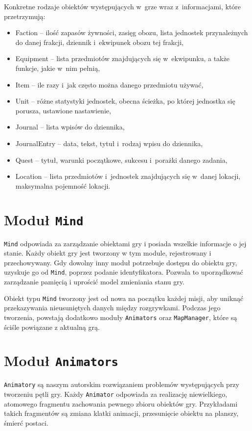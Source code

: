 \documentclass[licencjacka]{pracamgr}
\begin{document}
    Konkretne rodzaje obiektów występujących w~grze wraz z~informacjami, które przetrzymują:
    \begin{itemize}
      \item Faction -- ilość zapasów żywności, zasięg obozu, lista jednostek przynależnych do danej
	frakcji, dziennik i~ekwipunek obozu tej frakcji,
      \item Equipment -- lista przedmiotów znajdujących się w~ekwipunku, a także funkcje, jakie w~nim pełnią,
      \item Item --  ile razy i~jak często można danego przedmiotu używać,
      \item Unit -- różne statystyki jednostek, obecna ścieżka, po której jednostka się porusza, ustawione nastawienie,
      \item Journal -- lista wpisów do dziennika,
      \item JournalEntry -- data, tekst, tytuł i~rodzaj wpisu do dziennika,
      \item Quest -- tytuł, warunki początkowe, sukcesu i~porażki danego zadania,
      \item Location -- lista przedmiotów i~jednostek znajdujących się w~danej lokacji, maksymalna pojemność lokacji.
    \end{itemize}

  \section{Moduł \texttt{Mind}}

    \texttt{Mind} odpowiada za zarządzanie obiektami gry i posiada wszelkie informacje o jej stanie. 
    Każdy obiekt gry jest tworzony w tym module, rejestrowany i przechowywany. Gdy dowolny inny moduł potrzebuje dostępu do 
    obiektu gry, uzyskuje go od \texttt{Mind}, poprzez podanie identyfikatora. Pozwala to uporządkować zarządzanie pamięcią
    i uprościć model zmieniania stanu gry. 

    Obiekt typu \texttt{Mind} tworzony jest od nowa na początku każdej misji, aby uniknąć przekazywania nieusuniętych danych
    między rozgrywkami. Podczas jego tworzenia, powstają dodatkowo moduły \texttt{Animators} oraz \texttt{MapManager}, które 
    są ściśle powiązane z aktualną grą. 	
	
  \section{Moduł \texttt{Animators}}
    \texttt{Animatory} są naszym autorskim rozwiązaniem problemów występujących przy tworzeniu pętli gry. Każdy \texttt{Animator}
    odpowiada za realizację niewielkiego, atomowego fragmentu zachowania pewnego zbioru obiektów gry. Przykładami takich
    fragmentów są zmiana klatki animacji, przesunięcie obiektu na planszy, śmierć postaci.
    
\end{document}
